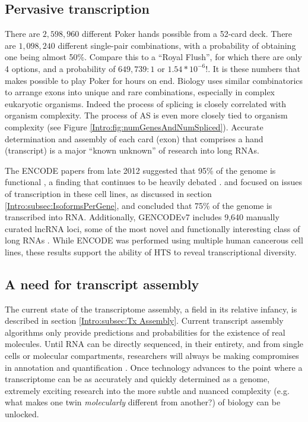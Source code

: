   \subsection{Pervasive transcription}
    \label{Disc:subsec:Pervasive Tx}

    There are $2,598,960$ different Poker hands possible from a 52-card deck. There are $1,098,240$ different single-pair combinations, with a probability of obtaining one being almost 50\%. Compare this to a ``Royal Flush'', for which there are only 4 options, and a probability of $649,739:1$ or $1.54 * 10^{-6}$!. It is these numbers that makes possible to play Poker for hours on end. Biology uses similar combinatorics to arrange exons into unique and rare combinations, especially in complex eukaryotic organisms. Indeed the process of splicing is closely correlated with organism complexity. The process of AS is even more closely tied to organism complexity (see Figure \ref{Intro:fig:numGenesAndNumSpliced}). Accurate determination and assembly of each card (exon) that comprises a hand (transcript) is a major ``known unknown'' \citep{Rumsfeld2011} of research into long RNAs.

    The ENCODE papers from late 2012 suggested that 95\% of the genome is functional \citep{Dunham2012}, a finding that continues to be heavily debated \citep{Graur2013,Bhattacharjee2014}. \citet{Djebali2012} and focused on issues of transcription in these cell lines, as discussed in section \ref{Intro:subsec:IsoformsPerGene}, and concluded that 75\% of the genome is transcribed into RNA. Additionally, GENCODEv7 includes 9,640 manually curated lncRNA loci, some of the most novel and functionally interesting class of long RNAs \citep{Derrien2012,Pauli2011}. While ENCODE was performed using multiple human cancerous cell lines, these results support the ability of HTS to reveal transcriptional diversity.

  \subsection{A need for transcript assembly}
    \label{Disc:subsec:need for Tx assembly}

    The current state of the transcriptome assembly, a field in its relative infancy, is described in section \ref{Intro:subsec:Tx Assembly}. Current transcript assembly algorithms only provide predictions and probabilities for the existence of real molecules. Until RNA can be directly sequenced, in their entirety, and from single cells or molecular compartments, researchers will always be making compromises in annotation and quantification \citep{Ozsolak2010}. Once technology advances to the point where a transcriptome can be as accurately and quickly determined as a genome, extremely exciting research into the more subtle and nuanced complexity (e.g. what makes one twin \textit{molecularly} different from another?) of biology can be unlocked.

